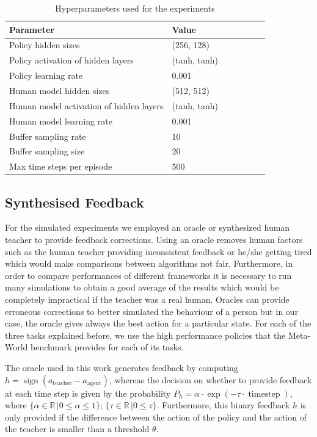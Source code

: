 \begin{table}[H]
\centering
\renewcommand{\arraystretch}{1.4}
\begin{tabular}{llS[table-format=2.2]SSS[table-format=2.2]S[table-format=2.2]}
\toprule
\textbf{Parameter }& \textbf{Value}\\[-.4em]
\midrule
Policy hidden sizes  &   (256, 128)\\
Policy activation of hidden layers  &   (tanh, tanh)\\
Policy learning rate  &  0.001\\
Human model hidden sizes &   (512, 512)\\
Human model activation of hidden layers  &   (tanh, tanh)\\
Human model learning rate  &   0.001\\
Buffer sampling rate&   10\\
Buffer sampling size &   20\\
Max time steps per episode &   500\\
\bottomrule
\end{tabular}
\caption{Hyperparameters used for the experiments}
\label{tab:hyperparameters}
\end{table}


\subsection{Synthesised Feedback}
\label{subsection:Synthesised Feedback}



For the simulated experiments we employed an oracle or synthesized human teacher to provide feedback corrections. Using an oracle removes human factors such as the human teacher providing inconsistent feedback or he/she getting tired which would make comparisons between algorithms not fair. Furthermore, in order to compare performances of different frameworks it is necessary to run many simulations to obtain a good average of the results which would be completely impractical if the teacher was a real human. Oracles can provide erroneous corrections to better simulated the behaviour of a person but in our case, the oracle gives always the best action for a particular state. 
For each of the three tasks explained before, we use the high performance policies that the Meta-World benchmark provides for each of its tasks.

 The oracle used in this work generates feedback by computing $h = \operatorname{sign}(a_\text{teacher} - a_\text{agent})$, whereas the decision on whether to provide feedback at each time step is given by the probability $P_h = \alpha \cdot \operatorname{exp}(-\tau \cdot \operatorname{time step})$, where $\{\alpha \in \mathbb{R}\, | 0 \leq \alpha \leq 1 \}$; $\{\tau \in \mathbb{R} \, | 0 \leq \tau\}$. Furthermore, this binary feedback $h$ is only provided if the difference between the action of the policy and the action of the teacher is smaller than a threshold $\theta$.






